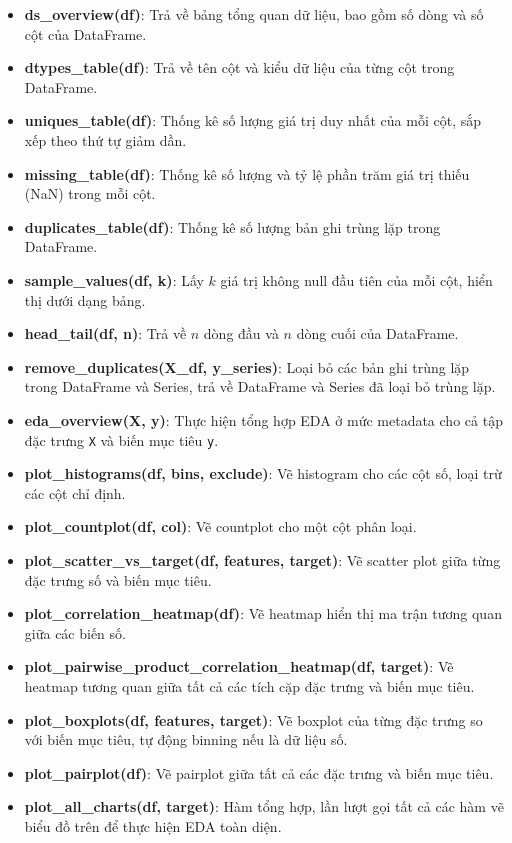 \begin{itemize}
	\item \textbf{ds\_overview(df)}: Trả về bảng tổng quan dữ liệu, bao gồm số dòng và số cột của DataFrame.
	\item \textbf{dtypes\_table(df)}: Trả về tên cột và kiểu dữ liệu của từng cột trong DataFrame.
	\item \textbf{uniques\_table(df)}: Thống kê số lượng giá trị duy nhất của mỗi cột, sắp xếp theo thứ tự giảm dần.
	\item \textbf{missing\_table(df)}: Thống kê số lượng và tỷ lệ phần trăm giá trị thiếu (NaN) trong mỗi cột.
	\item \textbf{duplicates\_table(df)}: Thống kê số lượng bản ghi trùng lặp trong DataFrame.
	\item \textbf{sample\_values(df, k)}: Lấy $k$ giá trị không null đầu tiên của mỗi cột, hiển thị dưới dạng bảng.
	\item \textbf{head\_tail(df, n)}: Trả về $n$ dòng đầu và $n$ dòng cuối của DataFrame.
	\item \textbf{remove\_duplicates(X\_df, y\_series)}: Loại bỏ các bản ghi trùng lặp trong DataFrame và Series, trả về DataFrame và Series đã loại bỏ trùng lặp.
	\item \textbf{eda\_overview(X, y)}: Thực hiện tổng hợp EDA ở mức metadata cho cả tập đặc trưng \texttt{X} và biến mục tiêu \texttt{y}.
	\item \textbf{plot\_histograms(df, bins, exclude)}: Vẽ histogram cho các cột số, loại trừ các cột chỉ định.
	\item \textbf{plot\_countplot(df, col)}: Vẽ countplot cho một cột phân loại.
	\item \textbf{plot\_scatter\_vs\_target(df, features, target)}: Vẽ scatter plot giữa từng đặc trưng số và biến mục tiêu.
	\item \textbf{plot\_correlation\_heatmap(df)}: Vẽ heatmap hiển thị ma trận tương quan giữa các biến số.
	\item \textbf{plot\_pairwise\_product\_correlation\_heatmap(df, target)}: Vẽ heatmap tương quan giữa tất cả các tích cặp đặc trưng và biến mục tiêu.
	\item \textbf{plot\_boxplots(df, features, target)}: Vẽ boxplot của từng đặc trưng so với biến mục tiêu, tự động binning nếu là dữ liệu số.
	\item \textbf{plot\_pairplot(df)}: Vẽ pairplot giữa tất cả các đặc trưng và biến mục tiêu.
	\item \textbf{plot\_all\_charts(df, target)}: Hàm tổng hợp, lần lượt gọi tất cả các hàm vẽ biểu đồ trên để thực hiện EDA toàn diện.
\end{itemize}

